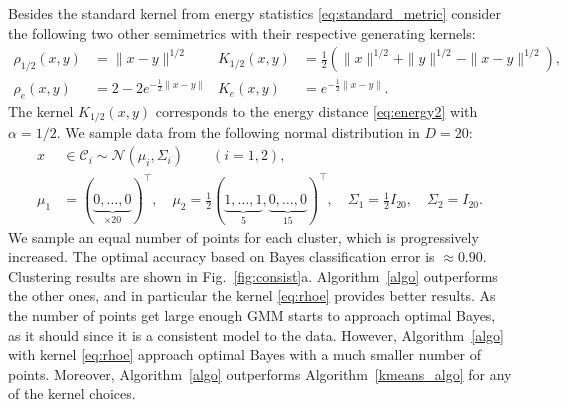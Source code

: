 \documentclass[aps,preprint,nofootinbib,floatfix]{revtex4-1}
\newcommand\kk{K}
\newcommand\C{{\mathcal{C}}}
\begin{document}
Besides the standard kernel from energy statistics 
\eqref{eq:standard_metric} 
consider the following two other semimetrics with their respective generating
kernels:
\begin{align}
\rho_{1/2}(x,y) &= \| x-y \|^{1/2} & 
 \kk_{1/2}(x,y) &= \tfrac{1}{2} \left( 
\| x \|^{1/2} + \| y \|^{1/2} 
- \| x-y \|^{1/2} \right), \label{eq:rhohalf}\\
\rho_{e}(x,y) &= 
2 - 2 e^{-\tfrac{1}{2}\| x- y\|} &
 \kk_{e}(x,y) &= e^{-\tfrac{1}{2}\| x-y\|}.
\label{eq:rhoe}
\end{align}
The kernel $K_{1/2}(x,y)$ corresponds to the energy distance
\eqref{eq:energy2} with $\alpha=1/2$.
We sample data from the following normal distribution in $D=20$:
\begin{equation}
\label{eq:20gauss}
\begin{split}
x &\in \C_i \sim \mathcal{N}(\mu_i,\Sigma_i) \qquad (i=1,2), \\
\mu_1 &= (\underbrace{0,\dotsc,0}_{\times 20})^\top ,\quad
\mu_2 = \tfrac{1}{2} 
(\underbrace{1,\dotsc,1}_{5},\underbrace{0,\dotsc,0}_{15})^\top, \quad
\Sigma_1 = \tfrac{1}{2} I_{20},  \quad
\Sigma_2 = I_{20}.
\end{split}
\end{equation}
We sample an equal number of points for each cluster, which is progressively
increased. The optimal accuracy based on Bayes
classification error is $\approx 0.90$. 
Clustering results are shown in Fig.~\ref{fig:consist}a.
Algorithm~\ref{algo} outperforms the other ones, and in 
particular the kernel \eqref{eq:rhoe} provides better results.
As the number of points get large enough GMM starts to approach
optimal Bayes, as it should since it is a
consistent model to the data. However, 
Algorithm~\ref{algo} with kernel \eqref{eq:rhoe} approach optimal Bayes
with a much smaller number of points. Moreover, Algorithm~\ref{algo} 
outperforms
Algorithm~\ref{kmeans_algo} for any of the kernel choices.
\end{document}
